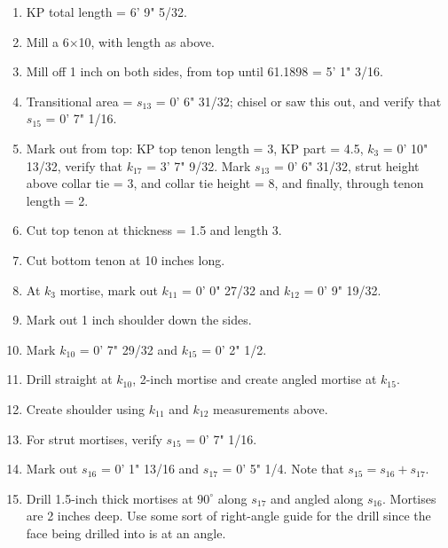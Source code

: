 \documentclass{article}\usepackage[]{graphicx}\usepackage[]{xcolor}
\begin{document}
\begin{enumerate}
  \item KP total length = 6' 9" 5/32.
  \item Mill a 6$\times$10, with length as above. 
  \item Mill off 1 inch on both sides, from top until 61.1898 = 5' 1" 3/16. 
  \item Transitional area = $s_{13}$ = 0' 6" 31/32; chisel or saw this out, and verify that $s_{15}$ = 0' 7" 1/16.
  \item Mark out from top: KP top tenon length = 3, KP part = 4.5, $k_3$ = 0' 10" 13/32, verify that $k_{17}$ = 3' 7" 9/32. Mark $s_{13}$ = 0' 6" 31/32, strut height above collar tie = 3, and collar tie height = 8, and finally, through tenon length = 2.
  \item Cut top tenon at thickness = 1.5 and length 3.
  \item Cut bottom tenon at 10 inches long.
  \item At $k_3$ mortise, mark out $k_{11}$ = 0' 0" 27/32 and $k_{12}$ = 0' 9" 19/32. 
  \item Mark out 1 inch shoulder down the sides. 
  \item Mark $k_{10}$ = 0' 7" 29/32 and $k_{15}$ = 0' 2" 1/2. 
  \item Drill straight at $k_{10}$, 2-inch mortise and create angled mortise at $k_{15}$. 
  \item Create shoulder using $k_{11}$ and $k_{12}$ measurements above. 
  \item For strut mortises, verify $s_{15}$ = 0' 7" 1/16.
  \item Mark out $s_{16}$ = 0' 1" 13/16 and $s_{17}$ = 0' 5" 1/4. Note that $s_{15} = s_{16} + s_{17}$. 
  \item Drill 1.5-inch thick mortises at $90^\circ$ along $s_{17}$ and angled along $s_{16}$. Mortises are 2 inches deep. Use some sort of right-angle guide for the drill since the face being drilled into is at an angle. 
\end{enumerate}
\end{document}
